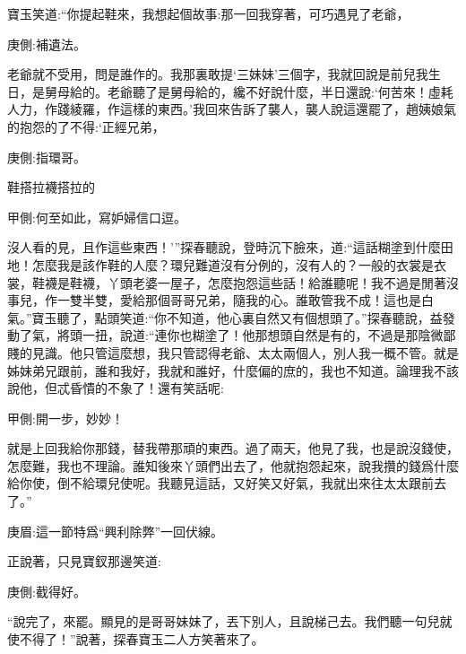 \begin{parag}
    寶玉笑道:“你提起鞋來，我想起個故事:那一回我穿著，可巧遇見了老爺，\begin{note}庚側:補遺法。\end{note}老爺就不受用，問是誰作的。我那裏敢提‘三妹妹’三個字，我就回說是前兒我生日，是舅母給的。老爺聽了是舅母給的，纔不好說什麼，半日還說:‘何苦來！虛耗人力，作踐綾羅，作這樣的東西。’我回來告訴了襲人，襲人說這還罷了，趙姨娘氣的抱怨的了不得:‘正經兄弟，\begin{note}庚側:指環哥。\end{note}鞋搭拉襪搭拉的\begin{note}甲側:何至如此，寫妒婦信口逗。\end{note}沒人看的見，且作這些東西！’”探春聽說，登時沉下臉來，道:“這話糊塗到什麼田地！怎麼我是該作鞋的人麼？環兒難道沒有分例的，沒有人的？一般的衣裳是衣裳，鞋襪是鞋襪，丫頭老婆一屋子，怎麼抱怨這些話！給誰聽呢！我不過是閒著沒事兒，作一雙半雙，愛給那個哥哥兄弟，隨我的心。誰敢管我不成！這也是白氣。”寶玉聽了，點頭笑道:“你不知道，他心裏自然又有個想頭了。”探春聽說，益發動了氣，將頭一扭，說道:“連你也糊塗了！他那想頭自然是有的，不過是那陰微鄙賤的見識。他只管這麼想，我只管認得老爺、太太兩個人，別人我一概不管。就是姊妹弟兄跟前，誰和我好，我就和誰好，什麼偏的庶的，我也不知道。論理我不該說他，但忒昏憒的不象了！還有笑話呢:\begin{note}甲側:開一步，妙妙！\end{note}就是上回我給你那錢，替我帶那頑的東西。過了兩天，他見了我，也是說沒錢使，怎麼難，我也不理論。誰知後來丫頭們出去了，他就抱怨起來，說我攢的錢爲什麼給你使，倒不給環兒使呢。我聽見這話，又好笑又好氣，我就出來往太太跟前去了。”\begin{note}庚眉:這一節特爲“興利除弊”一回伏線。\end{note}正說著，只見寶釵那邊笑道:\begin{note}庚側:截得好。\end{note}“說完了，來罷。顯見的是哥哥妹妹了，丟下別人，且說梯己去。我們聽一句兒就使不得了！”說著，探春寶玉二人方笑著來了。
\end{parag}


